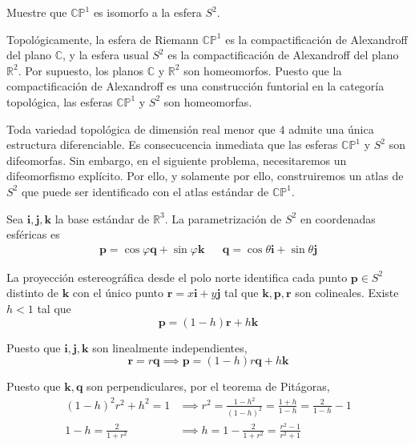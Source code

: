\begin{problem}
Muestre que $\mathbb {CP}^1$ es isomorfo a la esfera $S^2$.
\end{problem}

\begin{solution}
Topológicamente, la esfera de Riemann $\mathbb {CP}^1$ es la compactificación de Alexandroff del plano $\mathbb C$, y la esfera usual $S^2$ es la compactificación de Alexandroff del plano $\mathbb R^2$. Por supuesto, los planos $\mathbb C$ y $\mathbb R^2$ son homeomorfos. Puesto que la compactificación de Alexandroff es una construcción funtorial en la categoría topológica, las esferas $\mathbb {CP}^1$ y $S^2$ son homeomorfas.

Toda variedad topológica de dimensión real menor que $4$ admite una única estructura diferenciable. Es consecucencia inmediata que las esferas $\mathbb {CP}^1$ y $S^2$ son difeomorfas. Sin embargo, en el siguiente problema, necesitaremos un difeomorfismo explícito. Por ello, y solamente por ello, construiremos un atlas de $S^2$ que puede ser identificado con el atlas estándar de $\mathbb {CP}^1$.

Sea $\mathbf i, \mathbf j, \mathbf k$ la base estándar de $\mathbb R^3$. La parametrización de $S^2$ en coordenadas esféricas es
\begin{align*}
    \mathbf p = \cos \varphi \mathbf q + \sin \varphi \mathbf k &&
    \mathbf q = \cos \theta  \mathbf i + \sin \theta  \mathbf j
\end{align*}

La proyección estereográfica desde el polo norte identifica cada punto $\mathbf p \in S^2$ distinto de $\mathbf k$ con el único punto $\mathbf r = x \mathbf i + y \mathbf j$ tal que $\mathbf k, \mathbf p, \mathbf r$ son colineales. Existe $h < 1$ tal que
$$\mathbf p = (1-h) \mathbf r + h \mathbf k$$

Puesto que $\mathbf i, \mathbf j, \mathbf k$ son linealmente independientes,
$$\mathbf r = r \mathbf q \implies \mathbf p = (1-h)r \mathbf q + h \mathbf k$$

Puesto que $\mathbf k, \mathbf q$ son perpendiculares, por el teorema de Pitágoras,
\begin{align*}
    (1-h)^2 r^2 + h^2 = 1   & \implies r^2 = \frac {1 - h^2} {(1-h)^2} = \frac {1+h} {1-h} = \frac 2 {1-h} - 1 \\
    1-h = \frac 2 {1 + r^2} & \implies h = 1 - \frac 2 {1 + r^2} = \frac {r^2 - 1} {r^2 + 1}
\end{align*}


\end{solution}
